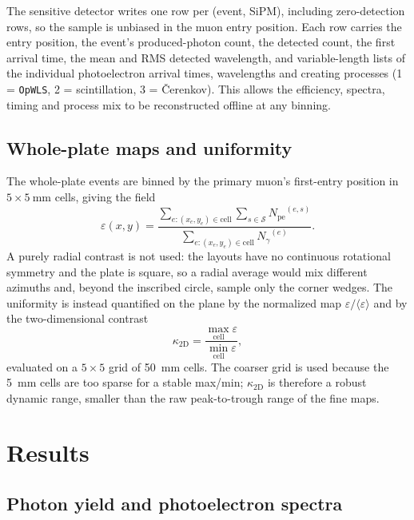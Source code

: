\documentclass[preprint,12pt]{elsarticle}
\newcommand{\pe}{\ensuremath{N_{\mathrm{pe}}}}
\newcommand{\ngam}{\ensuremath{N_{\gamma}}}
\newcommand{\eps}{\ensuremath{\varepsilon}}
\newcommand{\ktwo}{\ensuremath{\kappa_{\mathrm{2D}}}}
\begin{document}
The sensitive detector writes one row per (event, SiPM), including
zero-detection rows, so the sample is unbiased in the muon entry position. Each
row carries the entry position, the event's produced-photon count, the detected
count, the first arrival time, the mean and RMS detected wavelength, and
variable-length lists of the individual photoelectron arrival times,
wavelengths and creating processes (1 = \texttt{OpWLS}, 2 = scintillation,
3 = \v{C}erenkov). This allows the efficiency, spectra, timing and process mix
to be reconstructed offline at any binning.

\subsection{Whole-plate maps and uniformity}

The whole-plate events are binned by the primary muon's first-entry position in
$5\times\SI{5}{\milli\meter}$ cells, giving the field
\[
\eps(x,y)=
\frac{\sum_{e:(x_e,y_e)\in\mathrm{cell}}\sum_{s\in\mathcal{S}}\pe^{(e,s)}}
     {\sum_{e:(x_e,y_e)\in\mathrm{cell}}\ngam^{(e)}}.
\]
A purely radial contrast is not used: the layouts have no continuous rotational
symmetry and the plate is square, so a radial average would mix different
azimuths and, beyond the inscribed circle, sample only the corner wedges. The
uniformity is instead quantified on the plane by the normalized map
$\eps/\langle\eps\rangle$ and by the two-dimensional contrast
\begin{equation}
\ktwo=\frac{\max_{\mathrm{cell}}\eps}{\min_{\mathrm{cell}}\eps},
\end{equation}
evaluated on a $5\times5$ grid of \SI{50}{\milli\meter} cells. The coarser grid
is used because the \SI{5}{\milli\meter} cells are too sparse for a stable
max/min; $\ktwo$ is therefore a robust dynamic range, smaller than the raw
peak-to-trough range of the fine maps.

\section{Results}
\label{sec:results}

\subsection{Photon yield and photoelectron spectra}
\end{document}
